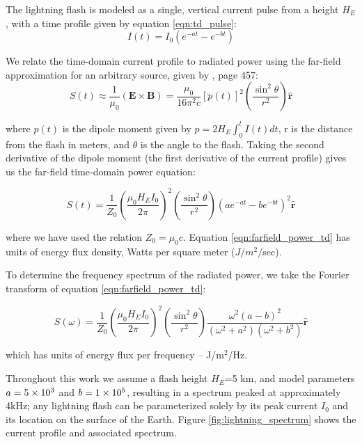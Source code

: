 The lightning flash is modeled as a single, vertical current pulse from a height $H_E$, with a time profile given by equation \ref{eqn:td_pulse}:
\begin{equation}
\label{eqn:td_pulse}
I(t)=I_0(e^{-a t} - e^{-b t})
\end{equation}

We relate the time-domain current profile to radiated power using the far-field approximation for an arbitrary source, given by \cite{Griffiths1999}, page 457:
\begin{equation}
\label{eqn:griffiths_power}
S(t) \approx \frac{1}{\mu_0}(\mathbf{E} \times \mathbf{B}) = \frac{\mu_0}{16\pi^2c}\left[\ddot{p}(t)\right]^2 \left(\frac{\sin^2\theta}{r^2}\right)\mathbf{\hat{r}}
\end{equation}

where $p(t)$ is the dipole moment given by $p=2 H_E \int_0^t{I(t)}dt$, r is the distance from the flash in meters, and $\theta$ is the angle to the flash. Taking the second derivative of the dipole moment (the first derivative of the current profile) gives us the far-field time-domain power equation:

\begin{equation}
\label{eqn:farfield_power_td}
S(t) = \frac{1}{Z_0}\left(\frac{\mu_0 H_E I_0}{2 \pi}\right)^2\left(\frac{\sin^2\theta}{r^2}\right) \left(a e^{-a t} - b e^{-b t}\right)^2  \mathbf{\hat{r}}
\end{equation}

where we have used the relation $Z_0 = \mu_0 c$. Equation \ref{eqn:farfield_power_td} has units of energy flux density, Watts per square meter ($J/m^2/$sec).

To determine the frequency spectrum of the radiated power, we take the Fourier transform of equation \ref{eqn:farfield_power_td}:

\begin{equation}
\label{eqn:farfield_power_fd}
S(\omega) = \frac{1}{Z_0}\left(\frac{\mu_0 H_E I_0}{2 \pi}\right)^2\left(\frac{\sin^2\theta}{r^2}\right) \frac{\omega^2(a-b)^2}{(\omega^2 + a^2)(\omega^2 + b^2)}  \mathbf{\hat{r}}
\end{equation}

which has units of energy flux per frequency -- J/m$^2$/Hz.

Throughout this work we assume a flash height $H_E$=5 km, and model parameters $a=5\times 10^{3}$ and $b=1\times 10^{5}$, resulting in a spectrum peaked at approximately 4kHz; any lightning flash can be parameterized solely by its peak current $I_0$ and its location on the surface of the Earth. Figure \ref{fig:lightning_spectrum} shows the current profile and associated spectrum.

